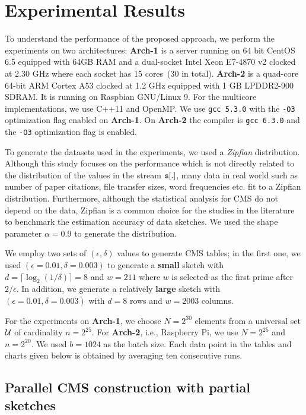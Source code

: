 \documentclass[10pt, conference, compsocconf]{IEEEtran}
\begin{document}
\section{Experimental Results}\label{sec:exp}

To understand the performance of the proposed approach, we perform the experiments on two architectures:  {\bf Arch-1} is a server running on 64 bit CentOS 6.5 equipped with 64GB RAM and a dual-socket Intel Xeon E7-4870 v2 clocked at 2.30 GHz where each socket has 15 cores~(30 in total). {\bf Arch-2} is a quad-core 64-bit ARM Cortex A53 clocked at 1.2 GHz equipped with 1 GB LPDDR2-900 SDRAM. It is running on Raspbian GNU/Linux 9. For the multicore implementations, we use C++11 and OpenMP. We use {\tt gcc 5.3.0} with the {\tt -O3} optimization flag enabled on {\bf Arch-1}. On {\bf Arch-2} the compiler is {\tt gcc 6.3.0} and the {\tt -O3} optimization flag is enabled.

To generate the datasets used in the experiments, we used a {\em Zipfian} distribution. Although this study focuses on the performance which is not directly related to the distribution of the values in the stream ${\tt s}[.]$, many data in real world such as number of paper citations, file transfer sizes, word frequencies etc. fit to a Zipfian distribution. Furthermore, although the statistical analysis for CMS do not depend on the data, Zipfian is a common choice for the studies in the literature to benchmark the estimation accuracy of data sketches. We used the shape parameter $\alpha = 0.9$ to generate the distribution. 

We employ two sets of $(\epsilon, \delta)$ values to generate CMS tables; in the first one, we used $(\epsilon = 0.01, \delta = 0.003)$ to generate a {\bf small} sketch with $d = \lceil \log_2(1/\delta) \rceil = 8$ and $w = 211$ where $w$ is selected as the first prime after $2/\epsilon$. In addition, we generate a relatively {\bf large} sketch with $(\epsilon = 0.01, \delta = 0.003)$ with $d = 8$ rows and $w = 2003$ columns.


For the experiments on {\bf Arch-1}, we choose $N = 2^{30}$ elements from a universal set $\cal U$ of cardinality $n = 2^{25}$. For {\bf Arch-2}, i.e., Raspberry Pi, we use $N = 2^{25}$ and $n = 2^{20}$. We used $b = 1024$ as the batch size. Each data point in the tables and charts given below is obtained by averaging ten consecutive runs. 

\subsection{Parallel CMS construction with partial sketches}
\end{document}
